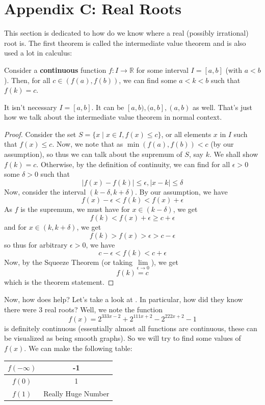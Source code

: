 \documentclass[11pt,titlepage]{scrartcl}
\begin{document}
\section{Appendix C: Real Roots}\label{appc}
This section is dedicated to how do we know where a real (possibly irrational) root is. The first theorem is called the intermediate value theorem and is also used a lot in calculus:
\begin{theorem}\label{ivt}
Consider a \textbf{continuous} function $f:I\to\mathbb R$ for some interval $I=[a,b]$ (with $a<b$). Then, for all $c\in (f(a),f(b))$, we can find some $a<k<b$ such that $f(k)=c$.
\end{theorem}
\begin{remark}
It isn't necessary $I=[a,b]$. It can be $[a,b),(a,b],(a,b)$ as well. That's just how we talk about the intermediate value theorem in normal context.
\end{remark}
\begin{proof}
Consider the set $S=\{x\mid x\in I, f(x)\leq c\}$, or all elements $x$ in $I$ such that $f(x)\leq c$. Now, we note that as $\min(f(a),f(b))<c$ (by our assumption), so thus we can talk about the supremum of $S$, say $k$. We shall show $f(k)=c$. Otherwise, by the definition of continuity, we can find for all $\epsilon>0$ some $\delta>0$ such that
\[|f(x)-f(k)|\leq\epsilon,|x-k|\leq\delta\]
Now, consider the interval $(k-\delta,k+\delta)$. By our assumption, we have
\[f(x)-\epsilon<f(k)<f(x)+\epsilon\]
As $f$ is the supremum, we must have for $x\in (k-\delta)$, we get
\[f(k)<f(x)+\epsilon\geq c+\epsilon\]
and for $x\in (k,k+\delta)$, we get
\[f(k)>f(x)>\epsilon>c-\epsilon\]
so thus for arbitrary $\epsilon>0$, we have
\[c-\epsilon<f(k)<c+\epsilon\]
Now, by the Squeeze Theorem (or taking $\lim\limits_{\epsilon\to0}$), we get
\[f(k)=c\]
which is the theorem statement.
\end{proof}
Now, how does  help? Let's take a look at . In particular, how did they know there were $3$ real roots? Well, we note the function
\[f(x)=2^{333x-2}+2^{111x+2}-2^{222x+2}-1\]
is definitely continuous (essentially almost all functions are continuous, these can be visualized as being smooth graphs). So we will try to find some values of $f(x)$. We can make the following table:
\begin{center}
 \begin{tabular}{|c | c|} 
 \hline
 $f(-\infty)$ & -1\\
 \hline
 $f(0)$ & 1\\ 
 \hline
 $f(1)$ & Really Huge Number \\
 \hline
\end{tabular}
\end{center}
\end{document}

